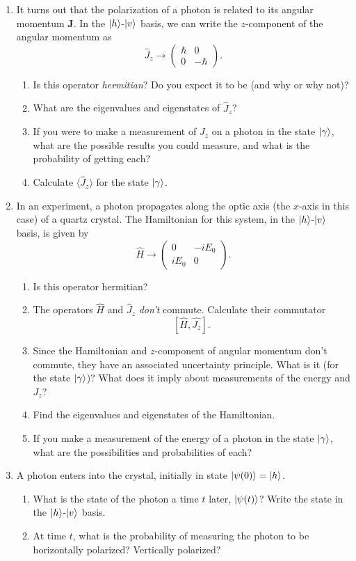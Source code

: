 \begin{problem}
\begin{enumerate} [label=(\alph*)]
\item It turns out that the polarization of a photon is related to its angular momentum $\mathbf{J}$.  In the $| h \rangle$-$| v \rangle$ basis, we can write the $z$-component of the angular momentum as
\[
\hat{J}_z \to \begin{pmatrix}
\hbar & 0 \\
0 & -\hbar
\end{pmatrix}.
\]
\begin{enumerate}[label=(\roman*)]
\item Is this operator \emph{hermitian}?  Do you expect it to be (and why or why not)?
\item What are the eigenvalues and eigenstates of $\hat{J}_z$?
\item If you were to make a measurement of $J_z$ on a photon in the state $| \gamma \rangle$, what are the possible results you could measure, and what is the probability of getting each?
\item Calculate $\langle \hat{J}_z \rangle$ for the state $| \gamma \rangle$.
\end{enumerate}

\item In an experiment, a photon propagates along the optic axis (the $x$-axis in this case) of a quartz crystal.  The Hamiltonian for this system, in the $| h \rangle$-$| v \rangle$ basis, is given by
\[
\hat{H} \to \begin{pmatrix}
0 & -iE_0 \\
iE_0 & 0
\end{pmatrix}.
\]
\begin{enumerate}[label=(\roman*)]
\item Is this operator hermitian?
\item The operators $\hat{H}$ and $\hat{J}_z$ \emph{don't} commute.  Calculate their commutator
\[
[\hat{H}, \hat{J_z}].
\]
\item Since the Hamiltonian and $z$-component of angular momentum don't commute, they have an associated uncertainty principle.  What is it (for the state $| \gamma \rangle$)?  What does it imply about measurements of the energy and $J_z$?
\item Find the eigenvalues and eigenstates of the Hamiltonian.
\item If you make a measurement of the energy of a photon in the state $| \gamma \rangle$, what are the possibilities and probabilities of each?
\end{enumerate}

\item A photon enters into the crystal, initially in state $| \psi(0) \rangle = | h \rangle$.  
\begin{enumerate}[label=(\roman*)]
\item What is the state of the photon a time $t$ later, $| \psi(t) \rangle$?  Write the state in the $| h \rangle$-$| v \rangle$ basis.
\item At time $t$, what is the probability of measuring the photon to be horizontally polarized?  Vertically polarized?
\end{enumerate}



\end{enumerate}
\end{problem}
